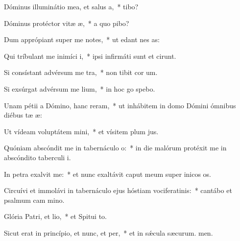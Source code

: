 \item Dóminus illuminátio mea, et salus a,~*  tibo?
\item Dóminus protéctor vitæ æ,~* a quo pibo?
\item Dum apprópiant super me notes,~* ut edant nes as:
\item Qui tríbulant me inimíci i,~* ipsi infirmáti sunt et cirunt.
\item Si consístant advérsum me tra,~* non tibit cor um.
\item Si exsúrgat advérsum me lium,~* in hoc go spebo.
\item Unam pétii a Dómino, hanc reram,~* ut inhábitem in domo Dómini ómnibus diébus tæ æ:
\item Ut vídeam voluptátem mini,~* et vísitem plum jus.
\item Quóniam abscóndit me in tabernáculo o:~* in die malórum protéxit me in abscóndito taberculi i.
\item In petra exalvit me:~* et nunc exaltávit caput meum super inicos os.
\item Circuívi et immolávi in tabernáculo ejus hóstiam vociferatinis:~* cantábo et psalmum cam mino.
\item Glória Patri, et lio,~* et Spitui to.
\item Sicut erat in princípio, et nunc, et per,~* et in sǽcula sæcurum. men.
